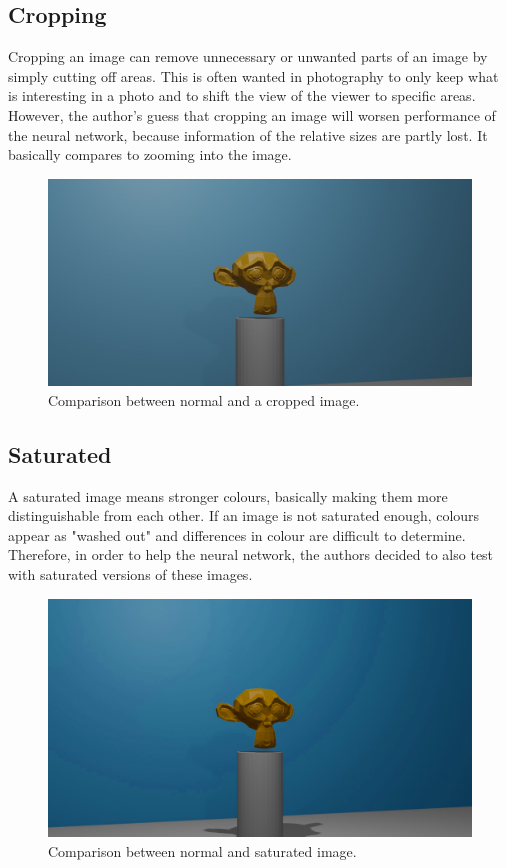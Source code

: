 \subsection{Cropping}

Cropping an image can remove unnecessary or unwanted parts of an image by simply cutting off areas. This is often wanted in photography to only keep what is interesting in a photo and to shift the view of the viewer to specific areas. However, the author's guess that cropping an image will worsen performance of the neural network, because information of the relative sizes are partly lost. It basically compares to zooming into the image.

\begin{figure}[h!]
	\centering
	\includegraphics[width=4.5in]{img/implementation_opencv_cropping.jpg}
	\caption{Comparison between normal and a cropped image.}
	\label{pic:implementation_opencv_cropping}
\end{figure}

\subsection{Saturated}

A saturated image means stronger colours, basically making them more distinguishable from each other. If an image is not saturated enough, colours appear as "washed out" and differences in colour are difficult to determine. Therefore, in order to help the neural network, the authors decided to also test with saturated versions of these images.

\begin{figure}[h!]
	\centering
	\includegraphics[width=4.5in]{img/implementation_opencv_saturated.jpg}
	\caption{Comparison between normal and saturated image.}
	\label{pic:implementation_opencv_saturated}
\end{figure}


